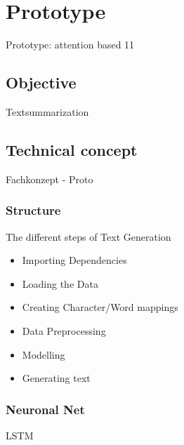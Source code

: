 \chapter{Prototype}\label{ch:proto}

Prototype: attention based 11




%

\section{Objective}

Textsummarization  

\section{Technical concept}

Fachkonzept - Proto

\subsection{Structure}

The different steps of Text Generation

\begin{itemize}
\item Importing Dependencies
\item Loading the Data
\item Creating Character/Word mappings
\item Data Preprocessing
\item Modelling
\item Generating text
\end{itemize}

\subsection{Neuronal Net}\label{ss:nn}

LSTM

